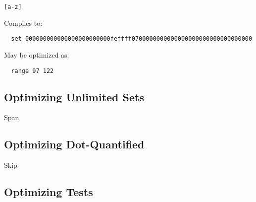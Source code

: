\begin{myquote}
\begin{verbatim}
[a-z]
\end{verbatim}
\end{myquote}

Compiles to:

\begin{myquote}
\begin{verbatim}
  set 000000000000000000000000feffff0700000000000000000000000000000000
\end{verbatim}
\end{myquote}

May be optimized as:

\begin{myquote}
\begin{verbatim}
  range 97 122
\end{verbatim}
\end{myquote}

\subsection{Optimizing Unlimited Sets}

Span

\subsection{Optimizing Dot-Quantified}

Skip

\subsection{Optimizing Tests}
